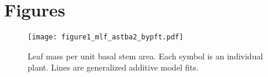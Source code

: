 \documentclass[a4paper]{article}
\begin{document}
% 
% 
% 
% 
% 
% 
% 
% 
% 
% 








\section{Figures}


\begin{figure}[h!]
    \centering
    \texttt{[image: figure1\_mlf\_astba2\_bypft.pdf]}
    \caption{Leaf mass per unit basal stem area. Each symbol is an individual plant. Lines are generalized additive model fits.}
    \label{fig:figure1}
\end{figure}
\end{document}
